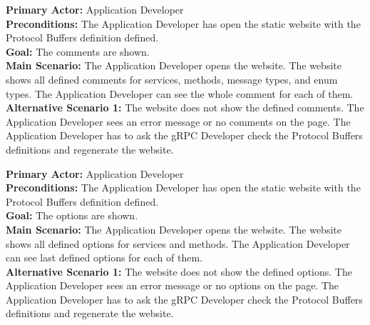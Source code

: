
\textbf{Primary Actor:} Application Developer\\
\textbf{Preconditions:} The Application Developer has open the static website with the Protocol Buffers definition defined.\\
\textbf{Goal:} The comments are shown.\\
\textbf{Main Scenario:}
The Application Developer opens the website.
The website shows all defined comments for services, methods, message types, and enum types.
The Application Developer can see the whole comment for each of them.\\
\textbf{Alternative Scenario 1:}
The website does not show the defined comments.
The Application Developer sees an error message or no comments on the page.
The Application Developer has to ask the gRPC Developer check the Protocol Buffers definitions and regenerate the website.


\textbf{Primary Actor:} Application Developer\\
\textbf{Preconditions:} The Application Developer has open the static website with the Protocol Buffers definition defined.\\
\textbf{Goal:} The options are shown.\\
\textbf{Main Scenario:}
The Application Developer opens the website.
The website shows all defined options for services and methods.
The Application Developer can see last defined options for each of them.\\
\textbf{Alternative Scenario 1:}
The website does not show the defined options.
The Application Developer sees an error message or no options on the page.
The Application Developer has to ask the gRPC Developer check the Protocol Buffers definitions and regenerate the website.







